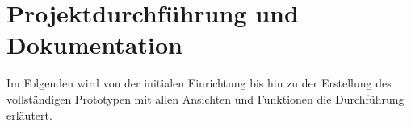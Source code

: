 \chapter{Projektdurchführung und Dokumentation}
Im Folgenden wird von der initialen Einrichtung bis hin zu der Erstellung des vollständigen Prototypen mit allen Ansichten und Funktionen die Durchführung erläutert. 